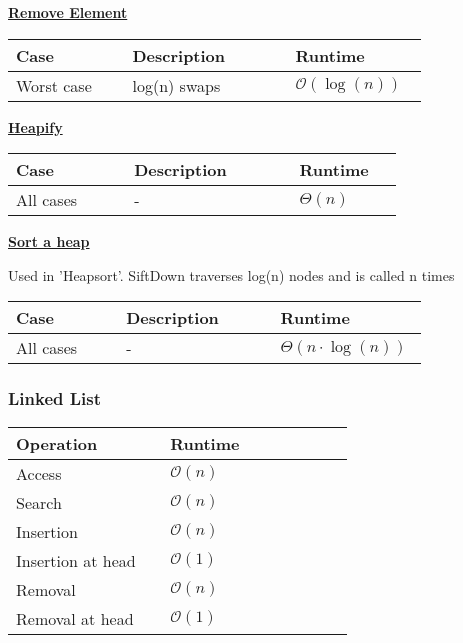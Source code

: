         {\centering\underline{\textbf{Remove Element}} \par}
        \begin{tabular*}{\linewidth}{| p{0.25\linewidth} | p{0.35\linewidth} | p{0.22\linewidth} |}
            \hline
            Case & Description & Runtime\\
            \hline \hline
            Worst case & log(n) swaps & $\mathcal{O}(\log(n))$ \\
            \hline
        \end{tabular*}

        {\centering\underline{\textbf{Heapify}} \par}
        \begin{tabular*}{\linewidth}{| p{0.25\linewidth} | p{0.35\linewidth} | p{0.22\linewidth} |}
            \hline
            Case & Description & Runtime\\
            \hline \hline
            All cases & - & $\Theta(n)$ \\
            \hline
        \end{tabular*}

        {\centering\underline{\textbf{Sort a heap}} \par}
        Used in 'Heapsort'. SiftDown traverses log(n) nodes and is called n times\\
        \begin{tabular*}{\linewidth}{| p{0.25\linewidth} | p{0.35\linewidth} | p{0.22\linewidth} |}
            \hline
            Case & Description & Runtime\\
            \hline \hline
            All cases & - & $\Theta(n \cdot \log(n))$ \\
            \hline
        \end{tabular*}
    
    \subsubsection{Linked List}
        \begin{tabular*}{\linewidth}{| p{0.4\linewidth} | p{0.48\linewidth} |}
            \hline
            Operation & Runtime\\
            \hline \hline
            Access &  $\mathcal{O}(n)$ \\
            \hline
            Search &  $\mathcal{O}(n)$ \\
            \hline
            Insertion & $\mathcal{O}(n)$ \\
            \hline
            Insertion at head & $\mathcal{O}(1)$ \\
            \hline
            Removal & $\mathcal{O}(n)$ \\
            \hline
            Removal at head & $\mathcal{O}(1)$\\
            \hline
        \end{tabular*}
    

